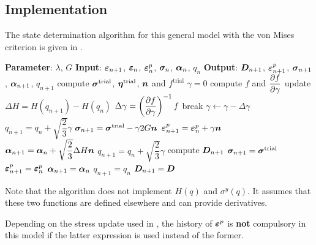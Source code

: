 \subsection{Implementation}
The state determination algorithm for this general model with the von Mises criterion is given in .
\begin{breakablealgorithm}
    \caption{state determination of general von Mises model}\label{algo:j2_model}
    \begin{algorithmic}
        \State \textbf{Parameter}: $\lambda$, $G$
        \State \textbf{Input}: $\bm{\varepsilon}_{n+1}$, $\bm{\varepsilon}_n$, $\bm{\varepsilon}^p_n$, $\bm{\sigma}_n$, $\bm{\alpha}_n$, $q_n$
        \State \textbf{Output}: $\bm{D}_{n+1}$, $\bm{\varepsilon}^p_{n+1}$, $\bm{\sigma}_{n+1}$, $\bm{\alpha}_{n+1}$, $q_{n+1}$
        \State compute $\bm{\sigma}^\text{trial}$, $\bm{\eta}^\text{trial}$, $\bm{n}$ and $f^\text{trial}$
        \State $\gamma=0$
        \State compute $f$ and $\dfrac{\partial{f}}{\partial{\gamma}}$
        \State update $\Delta{}H=H\left(q_{n+1}\right)-H\left(q_n\right)$
        \State $\Delta\gamma=\left(\dfrac{\partial{f}}{\partial{\gamma}}\right)^{-1}f$
        \State break
        \EndIf
        \State $\gamma\leftarrow\gamma-\Delta\gamma$
        \State $q_{n+1}=q_n+\sqrt{\dfrac{2}{3}}\gamma$
        \EndWhile
        \State $\bm{\sigma}_{n+1}=\bm{\sigma}^\text{trial}-\gamma2G\bm{n}$
        \State $\bm{\varepsilon}^p_{n+1}=\bm{\varepsilon}^p_n+\gamma\bm{n}$
        \State $\bm{\alpha}_{n+1}=\bm{\alpha}_n+\sqrt{\dfrac{2}{3}}\Delta{}H\bm{n}$
        \State $q_{n+1}=q_n+\sqrt{\dfrac{2}{3}}\gamma$
        \State compute $\bm{D}_{n+1}$
        \Else
        \State $\bm{\sigma}_{n+1}=\bm{\sigma}^\text{trial}$
        \State $\bm{\varepsilon}^p_{n+1}=\bm{\varepsilon}^p_n$
        \State $\bm{\alpha}_{n+1}=\bm{\alpha}_n$
        \State $q_{n+1}=q_n$
        \State $\bm{D}_{n+1}=\bm{D}$
        \EndIf
    \end{algorithmic}
\end{breakablealgorithm}
Note that the algorithm does not implement $H\left(q\right)$ and $\sigma^y\left(q\right)$.
It assumes that these two functions are defined elsewhere and can provide derivatives.

Depending on the stress update used in , the history of $\bm{\varepsilon}^p$ is \textbf{not} compulsory in this model if the latter expression is used instead of the former.
